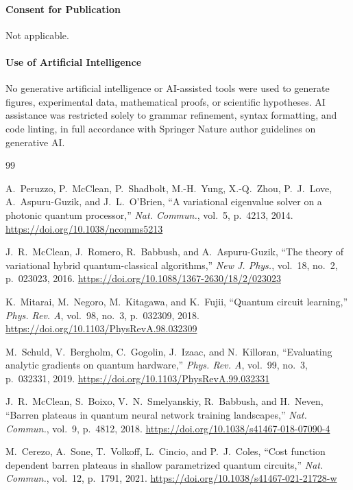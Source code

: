 \documentclass[11pt,a4paper]{article}
\begin{document}
\paragraph{Consent for Publication}
Not applicable.

\paragraph{Use of Artificial Intelligence}
No generative artificial intelligence or AI-assisted tools were used to generate figures, experimental data, mathematical proofs, or scientific hypotheses. AI assistance was restricted solely to grammar refinement, syntax formatting, and code linting, in full accordance with Springer Nature author guidelines on generative AI.

\begin{thebibliography}{99}
\setlength{\bibsep}{3pt plus 1pt minus 1pt}

A.~Peruzzo, P.~McClean, P.~Shadbolt, M.-H.~Yung, X.-Q.~Zhou, P.~J.~Love, A.~Aspuru-Guzik, and J.~L.~O'Brien,
\newblock ``A variational eigenvalue solver on a photonic quantum processor,''
\newblock \emph{Nat. Commun.}, vol.~5, p.~4213, 2014. \url{https://doi.org/10.1038/ncomms5213}

J.~R.~McClean, J.~Romero, R.~Babbush, and A.~Aspuru-Guzik,
\newblock ``The theory of variational hybrid quantum-classical algorithms,''
\newblock \emph{New J. Phys.}, vol.~18, no.~2, p.~023023, 2016. \url{https://doi.org/10.1088/1367-2630/18/2/023023}

K.~Mitarai, M.~Negoro, M.~Kitagawa, and K.~Fujii,
\newblock ``Quantum circuit learning,''
\newblock \emph{Phys. Rev. A}, vol.~98, no.~3, p.~032309, 2018. \url{https://doi.org/10.1103/PhysRevA.98.032309}

M.~Schuld, V.~Bergholm, C.~Gogolin, J.~Izaac, and N.~Killoran,
\newblock ``Evaluating analytic gradients on quantum hardware,''
\newblock \emph{Phys. Rev. A}, vol.~99, no.~3, p.~032331, 2019. \url{https://doi.org/10.1103/PhysRevA.99.032331}

J.~R.~McClean, S.~Boixo, V.~N.~Smelyanskiy, R.~Babbush, and H.~Neven,
\newblock ``Barren plateaus in quantum neural network training landscapes,''
\newblock \emph{Nat. Commun.}, vol.~9, p.~4812, 2018. \url{https://doi.org/10.1038/s41467-018-07090-4}

M.~Cerezo, A.~Sone, T.~Volkoff, L.~Cincio, and P.~J.~Coles,
\newblock ``Cost function dependent barren plateaus in shallow parametrized quantum circuits,''
\newblock \emph{Nat. Commun.}, vol.~12, p.~1791, 2021. \url{https://doi.org/10.1038/s41467-021-21728-w}


\end{thebibliography}
\end{document}
